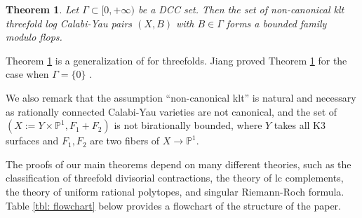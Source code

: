 \documentclass[11pt]{amsart}
\numberwithin{equation}{section}
\newcommand\han[1]{\todo[color=yellow!40]{#1}} %
\newcommand{\Pp}{\mathbb{P}}
\newcommand{\Ii}{{\Gamma}}
\newtheorem{thm}{Theorem}[section]
\theoremstyle{definition}
\theoremstyle{definition}
\begin{document}
\begin{thm}\label{thm: non-canonical klt CY threefold bdd flop}
Let $\Ii\subset[0,+\infty)$ be a DCC set. Then the set of non-canonical klt threefold log Calabi-Yau pairs $(X,B)$ with $B\in \Ii$ forms a bounded family modulo flops.
\end{thm}
Theorem \ref{thm: non-canonical klt CY threefold bdd flop} is a generalization of \cite[Theorem 1.4]{BDS20} for threefolds. Jiang proved Theorem \ref{thm: non-canonical klt CY threefold bdd flop} for the case when $\Ii=\{0\}$ \cite[Theorem 1.6]{Jia21}.  


We also remark that the assumption ``non-canonical klt'' is natural and necessary as rationally connected Calabi-Yau varieties are not canonical, and the set of $(X:=Y\times \Pp^1,F_1+F_2)$ is not birationally bounded, where $Y$ takes all K3 surfaces and $F_1,F_2$ are two fibers of $X\to \Pp^1$.

\medskip

The proofs of our main theorems depend on many different theories, such as the classification of threefold divisorial contractions, the theory of lc complements, the theory of uniform rational polytopes, and singular Riemann-Roch formula. Table \ref{tbl: flowchart} below provides a flowchart of the structure of the paper.
\end{document}
